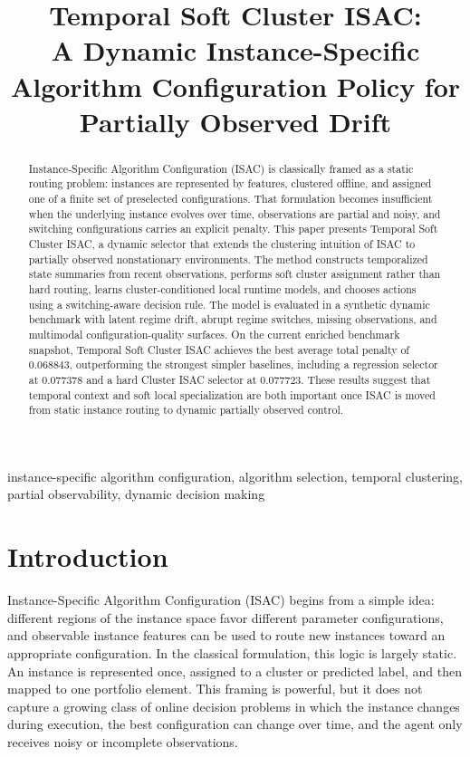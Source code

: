 \documentclass[conference]{IEEEtran}
\title{Temporal Soft Cluster ISAC:\\A Dynamic Instance-Specific Algorithm Configuration Policy for Partially Observed Drift}
\author{
\IEEEauthorblockN{Christian Speck}
\IEEEauthorblockA{ISAC Project Repository\\
Email: christian@example.com}
}
\begin{document}
\maketitle

\begin{abstract}
Instance-Specific Algorithm Configuration (ISAC) is classically framed as a static routing problem: instances are represented by features, clustered offline, and assigned one of a finite set of preselected configurations. That formulation becomes insufficient when the underlying instance evolves over time, observations are partial and noisy, and switching configurations carries an explicit penalty. This paper presents Temporal Soft Cluster ISAC, a dynamic selector that extends the clustering intuition of ISAC to partially observed nonstationary environments. The method constructs temporalized state summaries from recent observations, performs soft cluster assignment rather than hard routing, learns cluster-conditioned local runtime models, and chooses actions using a switching-aware decision rule. The model is evaluated in a synthetic dynamic benchmark with latent regime drift, abrupt regime switches, missing observations, and multimodal configuration-quality surfaces. On the current enriched benchmark snapshot, Temporal Soft Cluster ISAC achieves the best average total penalty of $0.068843$, outperforming the strongest simpler baselines, including a regression selector at $0.077378$ and a hard Cluster ISAC selector at $0.077723$. These results suggest that temporal context and soft local specialization are both important once ISAC is moved from static instance routing to dynamic partially observed control.
\end{abstract}

\begin{IEEEkeywords}
instance-specific algorithm configuration, algorithm selection, temporal clustering, partial observability, dynamic decision making
\end{IEEEkeywords}

\section{Introduction}

Instance-Specific Algorithm Configuration (ISAC) begins from a simple idea: different regions of the instance space favor different parameter configurations, and observable instance features can be used to route new instances toward an appropriate configuration. In the classical formulation, this logic is largely static. An instance is represented once, assigned to a cluster or predicted label, and then mapped to one portfolio element. This framing is powerful, but it does not capture a growing class of online decision problems in which the instance changes during execution, the best configuration can change over time, and the agent only receives noisy or incomplete observations.
\end{document}
